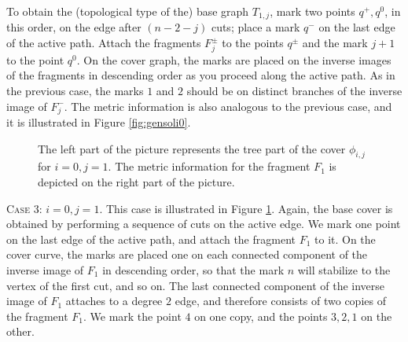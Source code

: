 \documentclass[11pt,reqno]{amsart}
\newcommand{\inputTikZ}[2]{%
     \resizebox{#1}{!}{}}
\theoremstyle{definition}
\begin{document}
To obtain the (topological type of the) base graph $T_{1,j}$, mark two points $q^+,q^0$, in this order, on the edge after $(n-2-j)$ cuts; place a mark $q^-$ on the last edge of the active path. Attach the fragments $F_j^\pm$ to the points $q^\pm$ and the mark $j+1$ to the point $q^0$.
On the cover graph, the marks are placed on the inverse images of the fragments in descending order as you proceed along the active path. As in the previous case, the marks $1$ and $2$ should be on distinct branches of the inverse image of $F_j^-$.
The metric information is also analogous to the previous case, and it is illustrated in Figure \ref{fig:gensoli0}.

\begin{figure}
    \centering
   \inputTikZ{\textwidth}{Figures/i=0j=1}
    \caption{The left part of the picture represents the tree part of the cover $\phi_{i,j}$ for $i=0, j=1$. The metric information for the fragment $F_1$ is depicted on the right part of the picture.}
    \label{fig:i0j1}
\end{figure}


\vspace{0.2cm}

\textsc{Case 3: $i=0, j=1$.}
This case is illustrated in Figure \ref{fig:i0j1}. Again, the base cover is obtained by performing a sequence of cuts on the active edge. We mark one point on the last edge of the active path, and attach the fragment $F_1$ to it.
On the cover curve, the marks are placed  one on each connected component of the inverse image of $F_1$ in descending order, so that the mark $n$ will stabilize to the vertex of the first cut, and so on. 
The last connected component of the inverse image of $F_1$ attaches to a degree $2$ edge, and therefore consists of two copies of the fragment $F_1$. We mark the point $4$ on one copy, and the points $3,2,1$ on the other.
\end{document}
